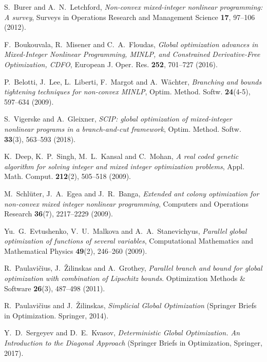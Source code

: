 \documentclass[
11pt,%
tightenlines,%
twoside,%
onecolumn,%
nofloats,%
nobibnotes,%
nofootinbib,%
superscriptaddress,%
noshowpacs,%
centertags]%
{revtex4}
\begin{document}
\begin{thebibliography}{99}

S.~Burer and A.~N.~Letchford, \textit{Non-convex mixed-integer nonlinear programming: A survey}, Surveys in Operations Research and Management Science \textbf{17}, 97--106 (2012).

F.~Boukouvala, R.~Misener and C.~A.~Floudas, \textit{Global optimization advances in Mixed-Integer Nonlinear Programming, MINLP, and Constrained Derivative-Free Optimization, CDFO}, European J. Oper. Res. \textbf{252}, 701--727 (2016).

P.~Belotti, J.~Lee, L.~Liberti, F.~Margot and A.~W\"achter, \textit{Branching and bounds tightening techniques for non-convex MINLP}, Optim. Method. Softw. \textbf{24}(4-5), 597--634 (2009).

S.~Vigerske and A.~Gleixner, \textit{SCIP: global optimization of mixed-integer nonlinear programs in a branch-and-cut framework}, Optim. Method. Softw. \textbf{33}(3), 563--593 (2018).

K.~Deep, K.~P.~Singh, M.~L.~Kansal and C.~Mohan, \textit{A real coded genetic algorithm for solving integer and mixed integer optimization problems}, Appl. Math. Comput. \textbf{212}(2), 505--518 (2009).

M.~Schl\"uter, J.~A.~Egea and J.~R.~Banga, \textit{Extended ant colony optimization for non-convex mixed integer nonlinear programming}, Computers and Operations Research \textbf{36}(7), 2217--2229 (2009).

Yu.~G.~Evtushenko, V.~U.~Malkova and A.~A.~Stanevichyus, \textit{Parallel global optimization of functions of several variables}, Computational Mathematics and Mathematical Physics \textbf{49}(2), 246--260 (2009).

R.~Paulavi\v{c}ius, J.~\v{Z}ilinskas and A.~Grothey, \textit{Parallel branch and bound for global optimization with combination of Lipschitz bounds}. Optimization Methods \& Software \textbf{26}(3), 487--498 (2011).

R.~Paulavi\v{c}ius and J.~\v{Z}ilinskas, \textit{Simplicial Global Optimization} (Springer Briefs in Optimization. Springer, 2014).

Y.~D.~Sergeyev and D.~E.~Kvasov, \textit{Deterministic Global Optimization. An Introduction to the Diagonal Approach}  (Springer Briefs in Optimization, Springer, 2017).



\end{thebibliography}
\end{document}
